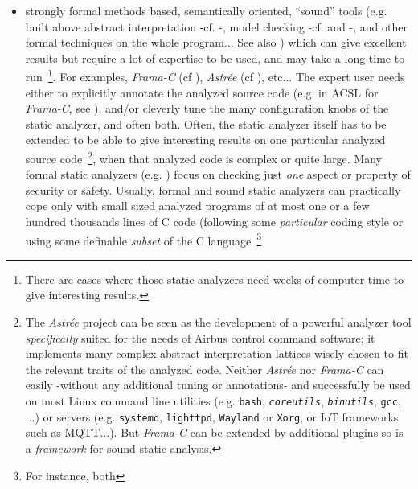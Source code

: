 \begin{itemize}
  \item strongly formal methods based, semantically oriented,
    ``sound'' tools (e.g. built above abstract interpretation -cf.
    \cite{Cousot:2014:AIP,CousotCousot77-1}-, model checking -cf.
    \cite{Schlich:2010:MCS, Siddiqui:2018:adv-soft-model-check} and
    \cite{Jhala:2009:SMC}-, and other formal techniques on the whole
    program... See also \cite{Andreasen:2017:SAI}) which can give
    excellent results but require a lot of expertise to be used, and
    may take a long time to run~\footnote{There are cases where those
      static analyzers need weeks of computer time to give interesting
      results.}. For examples, \emph{Frama-C} (cf
    \cite{Cuoq:2012:Frama-C}), \emph{Astrée} (cf
    \cite{Mine:2015:TIU}), etc... The expert user needs either to
    explicitly annotate the analyzed source code (e.g. in ACSL for
    \emph{Frama-C}, see \cite{Baudin:2018:ACSL, Delahaye:2013:CSL,
      Amin:2017:LAW}), and/or cleverly tune the many configuration
    knobs of the static analyzer, and often both. Often, the static
    analyzer itself has to be extended to be able to give interesting
    results on one particular analyzed source code~\footnote{The
      \emph{Astrée} project can be seen as the development of a
      powerful analyzer tool \emph{specifically} suited for the needs
      of Airbus control command software; it implements many complex
      abstract interpretation lattices wisely chosen to fit the
      relevant traits of the analyzed code. Neither \emph{Astrée} nor
      \emph{Frama-C} can easily -without any additional tuning or
      annotations- and successfully be used on most Linux command line
      utilities (e.g. \texttt{bash}, \texttt{\emph{coreutils}},
      \texttt{\emph{binutils}}, \texttt{gcc}, ...)  or servers
      (e.g. \texttt{systemd}, \texttt{lighttpd}, \texttt{Wayland} or
      \texttt{Xorg}, or IoT frameworks such as MQTT...). But
      \emph{Frama-C} can be extended by additional plugins so is a
      \emph{framework} for sound static analysis.}, when that analyzed
    code is complex or quite large. Many formal static analyzers
    (e.g. \cite{Greenaway:2014:DSS, Vedala:2012:ADP}) focus on
    checking just \emph{one} aspect or property of security or
    safety. Usually, formal and sound static analyzers can practically
    cope only with small sized analyzed programs of at most one or a
    few hundred thousands lines of C code (following some
    \emph{particular} coding style or using some definable
    \emph{subset} of the C language~\footnote{For instance, both
}
\end{itemize}
